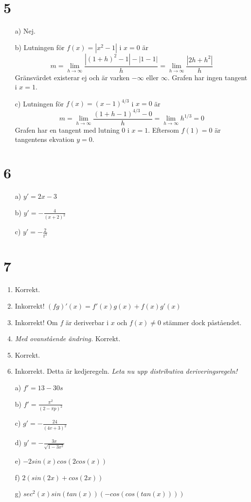 \documentclass{article}
\begin{document}
\section*{5}
\begin{itemize}
    \item[a) ] Nej.
    \item[b) ] Lutningen för $f(x) = |x^2 - 1|$ i $x = 0$ är
               $$m = \lim_{h \to \infty} \frac{|(1+h)^2 - 1| - |1-1|}{h}
                   = \lim_{h \to \infty} \frac{|2h+h^2|}{h}$$
               Gränsvärdet existerar ej och är varken $- \infty$ eller 
               $\infty$. Grafen har ingen tangent i $x = 1$.
    \item[c) ] Lutningen för $f(x) = (x-1)^{4/3}$ i $x = 0$ är
               $$m = \lim_{h \to \infty} \frac{(1+h-1)^{4/3}-0}{h}
                   = \lim_{h \to \infty} h^{1/3} = 0$$
               Grafen har en tangent med lutning $0$ i $x = 1$. 
               Eftersom $f(1) = 0$ är tangentens ekvation $y = 0$.
\end{itemize}

\section*{6}
\begin{itemize}
    \item[a) ] $y' = 2x - 3$
    \item[b) ] $y' = - \frac{4}{(x+2)^2}$
    \item[c) ] $y' = - \frac{2}{t^3}$
\end{itemize}

\section*{7}
\begin{enumerate}
    \item Korrekt.
    \item Inkorrekt! $(fg)'(x) = f'(x) g(x) + f(x) g'(x)$
    \item Inkorrekt! Om $f$ är deriverbar i $x$ och $f(x) \neq 0$ stämmer dock 
          påståendet.
    \item {\it Med ovanstående ändring.} Korrekt.
    \item Korrekt.
    \item Inkorrekt. Detta är kedjeregeln. 
          {\it Leta nu upp distributiva deriveringsregeln!}
\end{enumerate}
\begin{itemize}
    \item[a) ] $f' = 13 - 30s$
    \item[b) ] $f' = \frac{\pi ^2}{(2-\pi p)^2}$
    \item[c) ] $g' = - \frac{24}{(4v + 3)^2}$
    \item[d) ] $y' = - \frac{3x}{\sqrt{1-3x^2}}$
    \item[e) ] $-2 sin(x) cos(2 cos(x))$
    \item[f) ] $2(sin(2x) + cos(2x))$
    \item[g) ] $sec^2(x) sin(tan(x)) (-cos(cos(tan(x))))$
\end{itemize}
\end{document}
